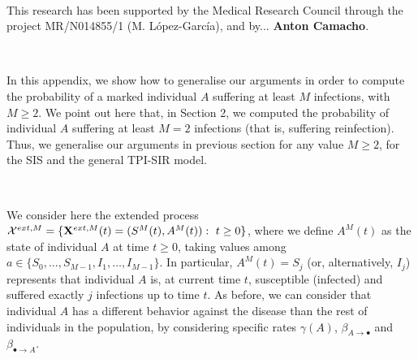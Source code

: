 \documentclass[preprint,12pt]{elsarticle}
\begin{document}
\vspace{1cm}

\par{}\\

\par\noindent This research has been supported by the Medical Research Council through the project MR/N014855/1 (M. L\'opez-Garc\'ia), and by... {\bf Anton Camacho}.\\

\vspace{1cm}

\par{}



\vspace{1cm}

\par{}\\

\par In this appendix, we show how to generalise our arguments in order to compute the probability of a marked individual $A$ suffering at least $M$
infections, with $M\geq2$. We point out here that, in Section 2, we computed the probability of individual $A$ suffering at least $M=2$ infections
(that is, suffering reinfection). Thus, we generalise our arguments in previous section for any value $M\geq2$, for the SIS and the general TPI-SIR model.\\

\vspace{0.5cm}

\par{}\\

\par We consider here the extended process ${\cal X}^{ext,M}=\{{\bf X}^{ext,M}(t)=(S^M(t),A^M(t)):\ t\geq0\}$, where we define $A^M(t)$ as the state of
individual $A$ at time $t\geq0$, taking values among $a\in\{S_0,\dots,S_{M-1},I_1,\dots,I_{M-1}\}$. In particular, $A^M(t)=S_j$ (or, alternatively,
$I_j$) represents that individual $A$ is, at current time $t$, susceptible (infected) and suffered exactly $j$ infections up to time $t$. As before, we
can consider that individual $A$ has a different behavior against the disease than the rest of individuals
in the population, by considering specific rates $\gamma(A)$, $\beta_{A\rightarrow\bullet}$ and $\beta_{\bullet\rightarrow A}$.
\end{document}
